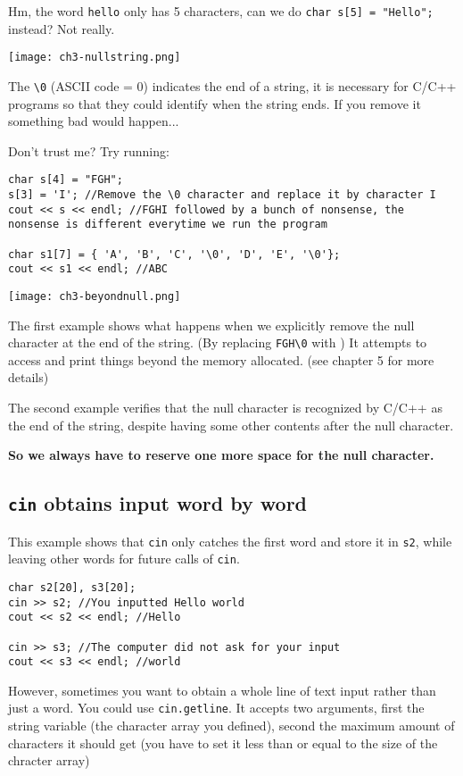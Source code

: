 Hm, the word \texttt{hello} only has 5 characters, can we do \texttt{char s[5] = "Hello";} instead? Not really.

\texttt{[image: ch3-nullstring.png]}

The \texttt{\textbackslash 0} (ASCII code = 0) indicates the end of a string, it is necessary for C/C++ programs so that they could identify when the string ends. If you remove it something bad would happen...

Don't trust me? Try running:

\begin{lstlisting}
char s[4] = "FGH";
s[3] = 'I'; //Remove the \0 character and replace it by character I
cout << s << endl; //FGHI followed by a bunch of nonsense, the nonsense is different everytime we run the program

char s1[7] = { 'A', 'B', 'C', '\0', 'D', 'E', '\0'};
cout << s1 << endl; //ABC
\end{lstlisting}

\texttt{[image: ch3-beyondnull.png]}

The first example shows what happens when we explicitly remove the null character at the end of the string. (By replacing \texttt{FGH\textbackslash 0} with ) It attempts to access and print things beyond the memory allocated. (see chapter 5 for more details)

The second example verifies that the null character is recognized by C/C++ as the end of the string, despite having some other contents after the null character.

\textbf{So we always have to reserve one more space for the null character.}

\subsection*{\texttt{cin} obtains input word by word}

This example shows that \texttt{cin} only catches the first word and store it in \texttt{s2}, while leaving other words for future calls of \texttt{cin}.

\begin{lstlisting}
char s2[20], s3[20];
cin >> s2; //You inputted Hello world
cout << s2 << endl; //Hello

cin >> s3; //The computer did not ask for your input
cout << s3 << endl; //world
\end{lstlisting}

\label{sec:cingetline}
However, sometimes you want to obtain a whole line of text input rather than just a word. You could use \texttt{cin.getline}. It accepts two arguments, first the string variable (the character array you defined), second the maximum amount of characters it should get (you have to set it less than or equal to the size of the chracter array)

